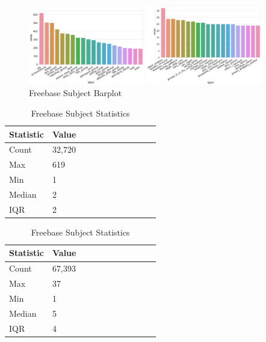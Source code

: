 
\begin{figure}[H]
	\parbox{.5\linewidth}{
   		\caption{Wordnet Subject Barplot}
   		\centering
    		\includegraphics[width=0.45\textwidth, height=0.2\textheight]{Wordnet_Subject_Counts}
		}
	\hfill
	\parbox{.5\linewidth}{
		\caption{Freebase Subject Barplot}
   		\centering
		\includegraphics[width=0.45\textwidth, height=0.2\textheight]{Freebase_Subject_Counts}
		}
\end{figure}


\begin{table}[H]
	\parbox{.5\linewidth}{
		\caption{Wordnet Subject Statistics}
		\centering
		\begin{tabular}{lllllllllll}
  			\textbf{Statistic} & \textbf{Value}  \\
  			\hline
			Count & 32,720 \\
			Max & 619 \\
			Min & 1 \\
  			Median & 2 \\
  			IQR & 2 \\
		\end{tabular}
		}
	\hfill
	\parbox{.5\linewidth}{
		\caption{Freebase Subject Statistics}
		\centering
		\begin{tabular}{lllllllllll}
  			\textbf{Statistic} & \textbf{Value}  \\
  			\hline
			Count & 67,393 \\
			Max & 37 \\
			Min & 1 \\
  			Median & 5 \\
  			IQR & 4 \\
		\end{tabular}
		}
\end{table}

